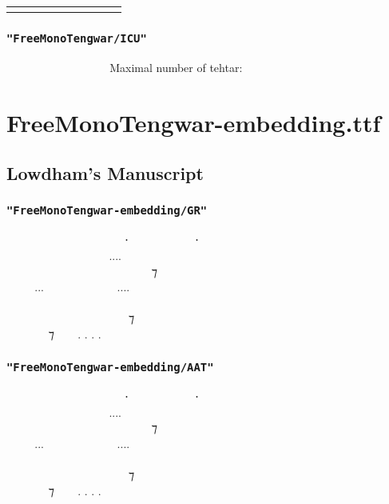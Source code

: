 \documentclass{article}
\begin{document}
\begin{tabular}{ c | c c c c c c c c}
	\combinationsrow{} \hline
	\combinationsrow{}
	\combinationsrow{}
	\combinationsrow{}
	\combinationsrow{}
	\combinationsrow{}
	\combinationsrow{}
	\combinationsrow{}
	\combinationsrow{}
\end{tabular}

\subsubsection*{\texttt{"FreeMonoTengwar/ICU"}}

\freeICU      \normalfont Maximal number of tehtar:
\freeICU  


\newpage

\section{FreeMonoTengwar-embedding.ttf}

\subsection{Lowdham’s Manuscript}

\subsubsection*{\texttt{"FreeMonoTengwar-embedding/GR"}}

\embedGR
  ‍   ⸱‍  ‍ ⸱ \\
    ‍....  ‍  \\
  ‍   ‍ ‍ ⁊ ‍  \\
...  ....   \\
         ‍ \\
 ‍ ‍‍   ⁊  ‍ ‍ \\
 ‍ ⁊  . . . . \normalfont

\subsubsection*{\texttt{"FreeMonoTengwar-embedding/AAT"}}

\embedAAT
  ‍   ⸱‍  ‍ ⸱ \\
    ‍....  ‍  \\
  ‍   ‍ ‍ ⁊ ‍  \\
...  ....   \\
         ‍ \\
 ‍ ‍‍   ⁊  ‍ ‍ \\
 ‍ ⁊  . . . . \normalfont
\end{document}
